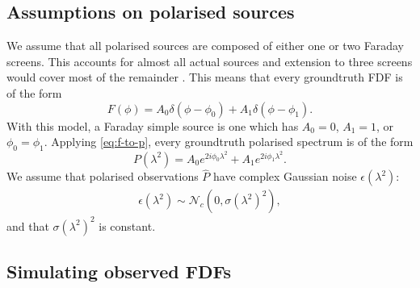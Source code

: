 
  \subsection{Assumptions on polarised sources}

    We assume that all polarised sources are composed of either one or two Faraday screens. This accounts for almost all actual sources \citep{anderson_broadband_2015} and extension to three screens would cover most of the remainder \citep{osullivan_broad-band_2017}. This means that every groundtruth FDF is of the form
    \begin{equation}
        \label{eq:true-fdf}
        F(\phi) = A_0 \delta(\phi - \phi_0) + A_1 \delta(\phi - \phi_1).
    \end{equation}
    With this model, a Faraday simple source is one which has $A_0 = 0$, $A_1 = 1$, or $\phi_0 = \phi_1$. Applying \autoref{eq:f-to-p}, every groundtruth polarised spectrum is of the form
    \begin{equation}
        \label{eq:true-pol}
        P(\lambda^2) = A_0 e^{2i\phi_0\lambda^2} + A_1 e^{2i\phi_1\lambda^2}.
    \end{equation}
    We assume that polarised observations $\hat P$ have complex Gaussian noise $\epsilon(\lambda^2)$:
    \begin{align}
        \label{eq:pol-noise}
        \epsilon(\lambda^2) \sim \mathcal N_c(0, \sigma(\lambda^2)^2),
    \end{align}
    and that $\sigma(\lambda^2)^2$ is constant.

  \subsection{Simulating observed FDFs}
  \label{sec:simulated-fdfs}

